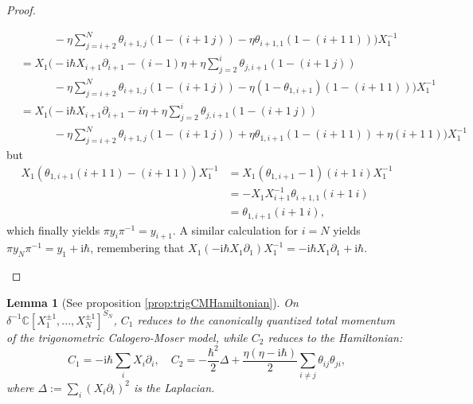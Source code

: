 \documentclass[11pt]{report}
\newtheorem{lemma}[theorem]{Lemma}
\theoremstyle{definition}
\theoremstyle{remark}
\theoremstyle{remark}
\newcommand{\C}{\mathbb{C}}
\newcommand{\I}{\mathrm{i}}
\begin{document}
\begin{proof}
\begin{enumerate}[label=(\roman*)]
\begin{align*}
&\quad \quad \quad - \eta \sum_{j=i+2}^N \theta_{i+1,j} (1-(i+1 \ j)) - \eta \theta_{i+1,1} (1-(i+1 \ 1)) \bigg) X_1^{-1} \\
&= X_1 \bigg( -\I \hbar X_{i+1} \partial_{i+1} - (i-1) \eta + \eta \sum_{j=2}^{i} \theta_{j,i+1} (1-(i+1 \ j)) \\
&\quad \quad \quad - \eta \sum_{j=i+2}^N \theta_{i+1,j} (1-(i+1 \ j)) - \eta (1-\theta_{1,i+1})(1-(i+1 \ 1)) \bigg) X_1^{-1} \\
&= X_1 \bigg( -\I \hbar X_{i+1} \partial_{i+1} - i \eta + \eta \sum_{j=2}^{i} \theta_{j,i+1} (1-(i+1 \ j)) \\
&\quad \quad \quad - \eta \sum_{j=i+2}^N \theta_{i+1,j} (1-(i+1 \ j)) + \eta \theta_{1,i+1}(1-(i+1 \ 1)) + \eta(i+1 \ 1) \bigg) X_1^{-1}
\end{align*}
but
\begin{align*}
X_1 (\theta_{1,i+1}(i+1 \ 1) - (i+1 \ 1)) X_1^{-1}
&= X_1 (\theta_{1,i+1}-1) (i+1 \ i) X_1^{-1} \\
&= - X_1 X_{i+1}^{-1} \theta_{i+1,1} (i+1 \ i) \\
&= \theta_{1,i+1} (i+1 \ i),
\end{align*}
which finally yields $\pi y_i \pi^{-1} = y_{i+1}$. A similar calculation for $i=N$ yields $\pi y_N \pi^{-1} = y_1 + \I \hbar$, remembering that $X_1 (-\I \hbar X_1 \partial_1) X_1^{-1} = -\I \hbar X_1 \partial_1 + \I \hbar$.
\vspace{-1.5\baselineskip}
\end{enumerate}
\end{proof}

\begin{lemma}[See proposition \ref{prop:trigCMHamiltonian}]\label{lemma:trigCMHamiltonianAppendix}
On $\delta^{-1} \C[X_1^{\pm 1},...,X_N^{\pm 1}]^{S_N}$, $C_1$ reduces to the canonically quantized total momentum of the trigonometric Calogero-Moser model, while $C_2$ reduces to the Hamiltonian:
\begin{equation*}
C_1 = -\I \hbar \sum_i X_i \partial_i, \quad C_2 = -\frac{\hbar^2}{2} \Delta + \frac{\eta(\eta-\I \hbar)}{2} \sum_{i \neq j} \theta_{ij} \theta_{ji},
\end{equation*}
where $\Delta := \sum_i (X_i \partial_i)^2$ is the Laplacian.
\end{lemma}
\end{document}
